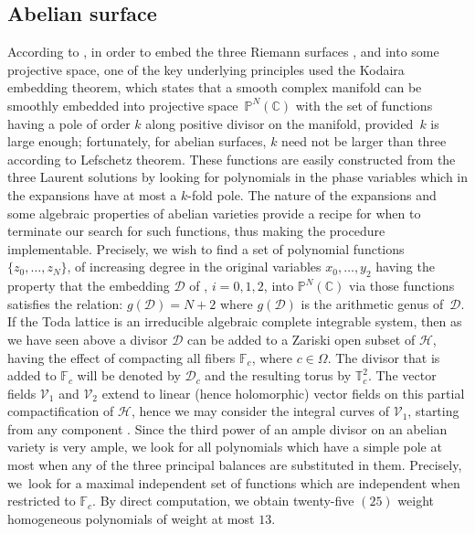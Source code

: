 \documentclass[10pt,a4paper]{amsart}
\numberwithin{equation}{section}
\begin{document}
 \subsection{Abelian surface}
 According to \cite{Dehainsala1}, in order to embed the three Riemann surfaces ,  and  into some projective space, one of the key underlying
principles used the Kodaira embedding theorem, which states that a
smooth complex manifold can be smoothly embedded into projective
space~$\mathbb{P}^{N} (\mathbb{C} )$ with the set of
functions having a pole of order $k$ along positive divisor on the
manifold, provided~$k$ is large enough; fortunately, for abelian
surfaces, $k$ need not be larger than three according to Lefschetz theorem. These functions are easily constructed from the three
Laurent solutions by looking for polynomials in the phase variables
which in the expansions have at most a $k$-fold pole. The nature of
the expansions and some algebraic properties of abelian varieties
provide a recipe for when to terminate our search for such
functions, thus making the procedure implementable. Precisely, we
wish to find a set of polynomial functions $\{z_0, \dots, z_N\}$,
of increasing degree in the original variables $x_0, \dots, y_2$
having the property that the embedding $\mathcal{D}$ of
, $i=0,1,2$, into
$\mathbb{P}^{N} (\mathbb{C} )$ via those functions
satisfies the relation: $g (\mathcal{D} ) = N + 2$ where
$g (\mathcal{D} )$ is the arithmetic genus of~$\mathcal{D}$.
If the  Toda lattice is an
irreducible algebraic complete integrable system, then as we have seen above a divisor
$\mathcal{D}$ can be added to a Zariski open subset of
$\mathcal{H}$, having the effect of compacting all fibers
$\mathbb{F}_c$, where $c \in \Omega$. The divisor that is added to
$\mathbb{F}_c$ will be denoted by $\mathcal{D}_c$ and the resulting
torus by $\mathbb{T}^2_c$. The vector fields $\mathcal{V}_1$ and
$\mathcal{V}_2$ extend to linear (hence holomorphic) vector fields
on this partial compactification of $\mathcal{H}$, hence we may
consider the integral curves of $\mathcal{V}_1$, starting from any
component . Since the third power of an ample
divisor on an abelian variety is very ample, we look for all
polynomials which have a simple pole at most when any of the three
principal balances are substituted in them. Precisely, we~look for a
maximal independent set of functions which are independent when
restricted to $\mathbb{F}_c$. By direct computation, we obtain
twenty-five $(25)$ weight homogeneous polynomials of weight at most
$13$.
\end{document}
